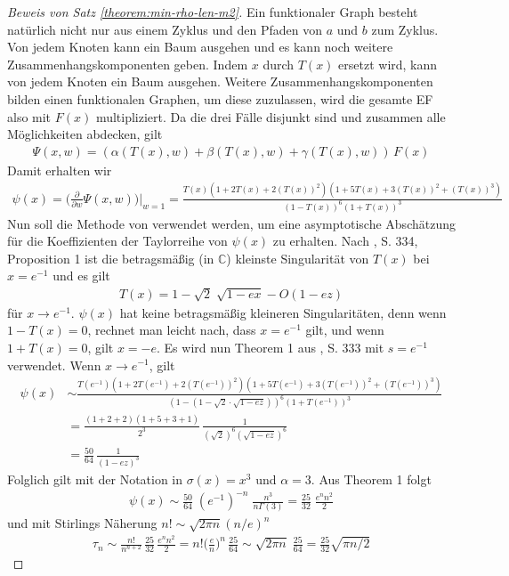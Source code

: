 \documentclass[a4paper, 11pt, ngerman]{article}
\newcommand{\C}{\mathbb{C}}
\begin{document}
\begin{proof}[Beweis von Satz \ref{theorem:min-rho-len-m2}]
    Ein funktionaler Graph besteht natürlich nicht nur aus einem Zyklus und den Pfaden von $a$ und $b$ zum Zyklus. Von jedem Knoten kann ein Baum ausgehen und es kann noch weitere Zusammenhangskomponenten geben. Indem $x$ durch $T(x)$ ersetzt wird, kann von jedem Knoten ein Baum ausgehen. Weitere Zusammenhangskomponenten bilden einen funktionalen Graphen, um diese zuzulassen, wird die gesamte EF also mit $F(x)$ multipliziert. Da die drei Fälle disjunkt sind und zusammen alle Möglichkeiten abdecken, gilt
    \begin{align*}
        \Psi(x, w)
        = (\alpha(T(x), w) + \beta(T(x), w) + \gamma(T(x), w)) \,F(x)
    \end{align*}
    Damit erhalten wir
    \begin{align*}
        \psi(x) = \Bigg (\frac {\partial} {\partial w}
        \Psi(x, w) \Bigg ) \Bigg \vert_{w = 1}
        = \frac
        {T(x)(1 + 2T(x) + 2(T(x))^2)(1 + 5T(x) + 3(T(x))^2 + (T(x))^3)}
        {(1 - T(x))^6(1 + T(x))^3}
    \end{align*}
    Nun soll die Methode von \cite{fo90} verwendet werden, um eine asymptotische Abschätzung für die Koeffizienten der Taylorreihe von $\psi(x)$ zu erhalten. Nach \cite{fo90}, S. 334, Proposition 1 ist die betragsmäßig (in $\C$) kleinste Singularität von $T(x)$ bei $x = e^{-1}$ und es gilt
    \begin{align*}
        T(x) = 1 - \sqrt{2} \; \sqrt {1 - ex} - O(1 - ez)
    \end{align*}
    für $x \to e^{-1}$. $\psi(x)$ hat keine betragsmäßig kleineren Singularitäten, denn wenn $1 - T(x) = 0$, rechnet man leicht nach, dass $x = e^{-1}$ gilt, und wenn $1 + T(x) = 0$, gilt $x = -e$. Es wird nun Theorem 1 aus \cite{fo90}, S. 333 mit $s = e^{-1}$ verwendet. Wenn $x \to e^{-1}$, gilt
    \begin{align*}
        \psi(x)
         & \sim \frac {T(e^{-1})(1 + 2T(e^{-1})
            + 2(T(e^{-1}))^2)(1 + 5T(e^{-1}) + 3(T(e^{-1}))^2 + (T(e^{-1}))^3)}
        {(1 - (1 - \sqrt 2 \cdot \sqrt {1 - ez}))^6(1 + T(e^{-1}))^3} \\
         & = \frac {(1 + 2 + 2)(1 + 5 + 3 + 1)} {2^3} \,
        \frac 1 {(\sqrt 2 )^6 (\sqrt{1 - ez})^6}                      \\
         & = \frac {50} {64} \, \frac 1 {(1 - ez)^3}
    \end{align*}
    Folglich gilt mit der Notation in \cite{fo90} $\sigma(x) = x^3$ und $\alpha = 3$. Aus Theorem 1 folgt
    \begin{align*}
        [x^n] \psi(x)
        \sim \frac {50} {64} \; (e^{-1})^{-n} \;
        \frac {n^3} {n \Gamma(3)}
        = \frac {25} {32} \; \frac {e^n n^2} {2}
    \end{align*}
    und mit Stirlings Näherung $n! \sim \sqrt{2\pi n} (n/e)^n$
    \begin{align*}
        \tau_n
        \sim \frac {n!}{n^{n + 2}} \, \frac {25} {32} \,\frac {e^n n^2} 2
        = n! \bigg (\frac {e} {n} \bigg )^n \, \frac {25} {64}
        \sim \sqrt {2 \pi n} \; \frac {25}{64}
        = \frac {25} {32} \sqrt{\pi n/2}
    \end{align*}
\end{proof}
\end{document}
